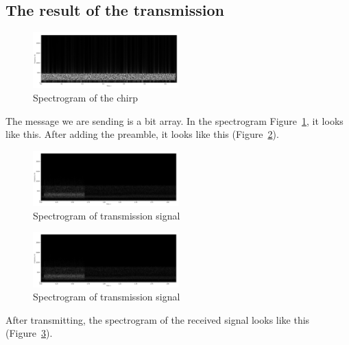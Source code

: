 \documentclass[twocolumn,conference]{IEEEtran}
\begin{document}
\subsection{The result of the transmission}
\begin{figure}[h]
    \centering
    \includegraphics[width=0.5\textwidth]{./asset/message.png}
    \caption{Spectrogram of the chirp}
    \label{fig:chirp_spectrogram}
\end{figure}
The message we are sending is a bit array. In the spectrogram Figure~\ref{fig:chirp_spectrogram}, it looks like this. 
After adding the preamble, it looks like this (Figure~\ref{fig:spectrogram_trm}).
\begin{figure}[h]
    \centering
    \includegraphics[width=0.5\textwidth]{./asset/msg_received.png}
    \caption{Spectrogram of transmission signal}
    \label{fig:spectrogram_trm}
\end{figure}
\begin{figure}[h]
    \centering
    \includegraphics[width=0.5\textwidth]{./asset/msg_received.png}
    \caption{Spectrogram of transmission signal}
    \label{fig:msg_received}
\end{figure}
After transmitting, the spectrogram of the received signal looks like this (Figure~\ref{fig:msg_received}).
\end{document}
